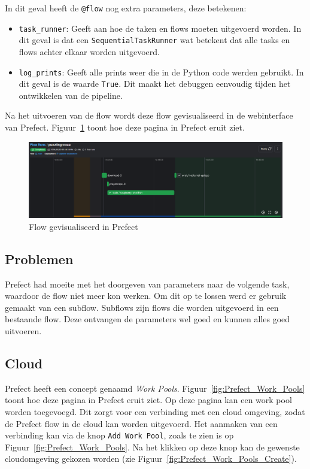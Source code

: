 In dit geval heeft de \texttt{@flow} nog extra parameters, deze betekenen:

\begin{itemize}
    \item \texttt{task\_runner}: Geeft aan hoe de taken en flows moeten uitgevoerd worden. In dit geval is dat een \texttt{SequentialTaskRunner} wat betekent dat alle tasks en flows achter elkaar worden uitgevoerd.
    \item \texttt{log\_prints}: Geeft alle prints weer die in de Python code werden gebruikt. In dit geval is de waarde \texttt{True}. Dit maakt het debuggen eenvoudig tijden het ontwikkelen van de pipeline.
\end{itemize}

Na het uitvoeren van de flow wordt deze flow gevisualiseerd in de webinterface van Prefect. Figuur~\ref{fig:Prefect_Flow} toont hoe deze pagina in Prefect eruit ziet.
\begin{figure}[h]
    \centering
    \includegraphics[width=0.9\linewidth]{graphics/Prefect_Flow.PNG}
    \caption{Flow gevisualiseerd in Prefect}
    \label{fig:Prefect_Flow}
\end{figure}

\subsection{Problemen}

Prefect had moeite met het doorgeven van parameters naar de volgende task, waardoor de flow niet meer kon werken. Om dit op te lossen werd er gebruik gemaakt van een subflow. Subflows zijn flows die worden uitgevoerd in een bestaande flow. Deze ontvangen de parameters wel goed en kunnen alles goed uitvoeren.

\subsection{Cloud}

Prefect heeft een concept genaamd \textit{Work Pools}. Figuur~\ref{fig:Prefect_Work_Pools} toont hoe deze pagina in Prefect eruit ziet. Op deze pagina kan een work pool worden toegevoegd. Dit zorgt voor een verbinding met een cloud omgeving, zodat de Prefect flow in de cloud kan worden uitgevoerd. Het aanmaken van een verbinding kan via de knop \texttt{Add Work Pool}, zoals te zien is op Figuur~\ref{fig:Prefect_Work_Pools}. Na het klikken op deze knop kan de gewenste cloudomgeving gekozen worden (zie Figuur~\ref{fig:Prefect_Work_Pools_Create}).

